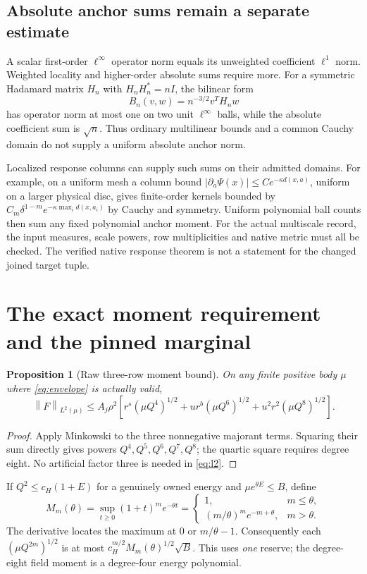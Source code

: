 \documentclass[11pt,letterpaper]{article}
\numberwithin{equation}{section}
\theoremstyle{plain}
\newtheorem{proposition}[theorem]{Proposition}
\theoremstyle{remark}\newtheorem{remark}[theorem]{Scope}
\newcommand{\norm}[1]{\left\lVert#1\right\rVert}
\begin{document}
\subsection{Absolute anchor sums remain a separate estimate}

A scalar first-order $\ell^\infty$ operator norm equals its unweighted
coefficient $\ell^1$ norm. Weighted locality and higher-order absolute
sums require more. For a symmetric Hadamard matrix $H_n$ with
$H_nH_n^*=nI$, the bilinear form
\[
 B_n(v,w)=n^{-3/2}v^TH_nw
\]
has operator norm at most one on two unit $\ell^\infty$ balls, while the
absolute coefficient sum is $\sqrt n$. Thus ordinary multilinear bounds
and a common Cauchy domain do not supply a uniform absolute anchor norm.

Localized response columns can supply such sums on their admitted domains.
For example, on a uniform mesh a column bound
$|\partial_a\Psi(x)|\le Ce^{-\kappa d(x,a)}$, uniform on a larger physical
disc, gives finite-order kernels bounded by
$C_m\delta^{1-m}e^{-\kappa\max_i d(x,a_i)}$ by Cauchy and symmetry.
Uniform polynomial ball counts then sum any fixed polynomial anchor moment.
For the actual multiscale record, the input measures, scale powers, row
multiplicities and native metric must all be checked. The verified native
response theorem is not a statement for the changed joined target tuple.

\section{The exact moment requirement and the pinned marginal}

\begin{proposition}[Raw three-row moment bound]
On any finite positive body $\mu$ where \eqref{eq:envelope} is actually valid,
\begin{equation}
 \norm F_{L^2(\mu)}\le A_j\rho^2\left[
 r^s(\mu Q^4)^{1/2}+ur^b(\mu Q^6)^{1/2}
 +u^2r^2(\mu Q^8)^{1/2}\right].
 \label{eq:l2}
\end{equation}
\end{proposition}
\begin{proof}
Apply Minkowski to the three nonnegative majorant terms. Squaring their
sum directly gives powers $Q^4,Q^5,Q^6,Q^7,Q^8$; the quartic square
requires degree eight. No artificial factor three is needed in
\eqref{eq:l2}.
\end{proof}

If $Q^2\le c_H(1+E)$ for a genuinely owned energy and
$\mu e^{\theta E}\le B$, define
\begin{equation}
 M_m(\theta)=\sup_{t\ge0}(1+t)^me^{-\theta t}
 =\begin{cases}
 1,&m\le\theta,\\
 (m/\theta)^me^{-m+\theta},&m>\theta.
 \end{cases}
 \label{eq:mm}
\end{equation}
The derivative locates the maximum at $0$ or $m/\theta-1$. Consequently
each $(\mu Q^{2m})^{1/2}$ is at most
$c_H^{m/2}M_m(\theta)^{1/2}\sqrt B$. This uses \emph{one} reserve;
the degree-eight field moment is a degree-four energy polynomial.
\end{document}
